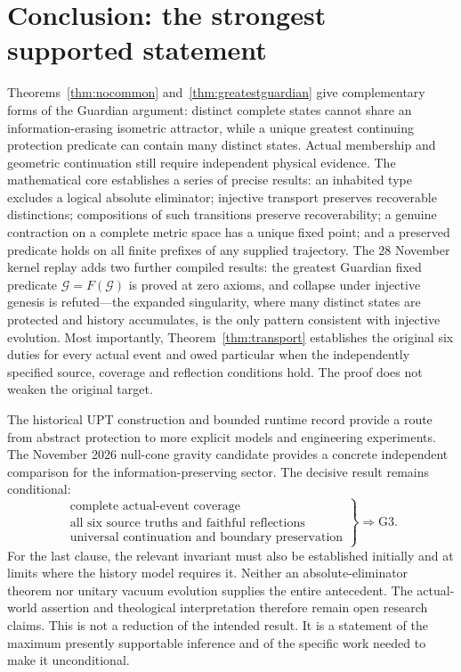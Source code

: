 \documentclass[11pt,a4paper]{article}
\begin{document}
\section{Conclusion: the strongest supported statement}
Theorems~\ref{thm:nocommon} and~\ref{thm:greatestguardian} give complementary forms of the Guardian argument: distinct complete states cannot share an information-erasing isometric attractor, while a unique greatest continuing protection predicate can contain many distinct states. Actual membership and geometric continuation still require independent physical evidence.
The mathematical core establishes a series of precise results: an inhabited type excludes a logical absolute eliminator; injective transport preserves recoverable distinctions; compositions of such transitions preserve recoverability; a genuine contraction on a complete metric space has a unique fixed point; and a preserved predicate holds on all finite prefixes of any supplied trajectory. The 28 November kernel replay adds two further compiled results: the greatest Guardian fixed predicate $\mathcal{G}=F(\mathcal{G})$ is proved at zero axioms, and collapse under injective genesis is refuted---the expanded singularity, where many distinct states are protected and history accumulates, is the only pattern consistent with injective evolution. Most importantly, Theorem~\ref{thm:transport} establishes the original six duties for every actual event and owed particular when the independently specified source, coverage and reflection conditions hold. The proof does not weaken the original target.

The historical UPT construction and bounded runtime record provide a route from abstract protection to more explicit models and engineering experiments. The November 2026 null-cone gravity candidate provides a concrete independent comparison for the information-preserving sector. The decisive result remains conditional:
\[
\left.\begin{array}{c}
\text{complete actual-event coverage}\\
\text{all six source truths and faithful reflections}\\
\text{universal continuation and boundary preservation}
\end{array}\right\}\Longrightarrow \mathrm{G3}.
\]
For the last clause, the relevant invariant must also be established initially and at limits where the history model requires it. Neither an absolute-eliminator theorem nor unitary vacuum evolution supplies the entire antecedent. The actual-world assertion and theological interpretation therefore remain open research claims. This is not a reduction of the intended result. It is a statement of the maximum presently supportable inference and of the specific work needed to make it unconditional.
\end{document}

